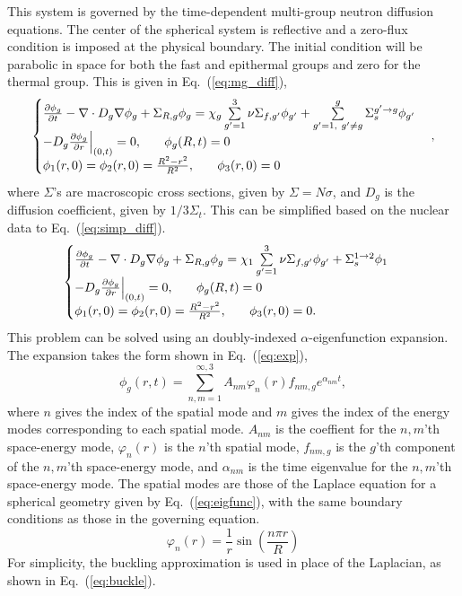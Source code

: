 \documentclass{style/nseJournal}
\newcommand{\fn}[1]{\left( #1 \right)}
\newcommand{\dxdy}[2]{\frac{\partial #1}{\partial #2}}
\newcommand{\be}{\begin{equation}}
\newcommand{\ee}{\end{equation}}
\newcommand{\pev}{\hspace{0.25in}}
\newcommand{\LEQ}[1]{\label{eq:#1}}
\newcommand{\EQ}[1]{Eq.~(\ref{eq:#1})}
\begin{document}
This system is governed by the time-dependent multi-group neutron diffusion equations.  
The center of the spherical system is reflective and a zero-flux condition is imposed at the physical boundary.  
The initial condition will be parabolic in space for both the fast and epithermal groups and zero for the thermal group.  
This is given in \EQ{mg_diff},
\be
	\begin{cases}
		\dxdy{\phi_g}{t} - \nabla \cdot D_g \nabla \phi_g + \Sigma_{R,g} \phi_g = \chi_g \sum\limits_{g'=1}^{3} 
			\nu\Sigma_{f,g'} \phi_{g'} + \sum\limits_{g'=1, \ g' \neq g}^g \Sigma_s^{g' \rightarrow g} \phi_{g'} \\
		-D_g \dxdy{\phi_g}{r} \Big\rvert_{(0,t)} = 0, \pev \phi_g(R,t) = 0 \\
		\phi_1(r,0) = \phi_2(r,0) = \frac{R^2 - r^2}{R^2}, \pev \phi_3(r,0) = 0
	\end{cases} ,
	\LEQ{mg_diff}
\ee 
where $\Sigma$'s are macroscopic cross sections, given by $\Sigma = N\sigma$, and $D_g$ is the diffusion coefficient, given by $1/3\Sigma_t$.  
This can be simplified based on the nuclear data to \EQ{simp_diff}.
\be
	\begin{cases}
		\dxdy{\phi_g}{t} - \nabla \cdot D_g \nabla \phi_g + \Sigma_{R,g} \phi_g = \chi_1 \sum\limits_{g'=1}^{3} 
			\nu\Sigma_{f,g'} \phi_{g'} + \Sigma_s^{1 \rightarrow 2} \phi_{1} \\
		-D_g \dxdy{\phi_g}{r} \Big\rvert_{(0,t)} = 0, \pev \phi_g(R,t) = 0 \\
		\phi_1(r,0) = \phi_2(r,0) = \frac{R^2 - r^2}{R^2}, \pev \phi_3(r,0) = 0.
	\end{cases} 
	\LEQ{simp_diff}
\ee
This problem can be solved using an doubly-indexed $\alpha$-eigenfunction expansion.  
The expansion takes the form shown in \EQ{exp},
\be
	\phi_g(r, t) = \sum_{n, m = 1}^{\infty, 3} A_{nm} \varphi_n(r) f_{nm, g} e^{\alpha_{nm} t},
	\LEQ{exp} 
\ee
where $n$ gives the index of the spatial mode and $m$ gives the index of the energy modes corresponding to each spatial mode.  
$A_{nm}$ is the coeffient for the $n,m$'th space-energy mode, $\varphi_n(r)$ is 
the $n$'th spatial mode, $f_{nm, g}$ is the $g$'th component of the $n,m$'th space-energy mode, and $\alpha_{nm}$ is the time eigenvalue for the $n,m$'th space-energy mode.  
The spatial modes are those of the Laplace equation for a spherical geometry given by \EQ{eigfunc}, with the same boundary conditions as those in the governing equation.  
\be
	\varphi_n(r) = \frac{1}{r} \sin\fn{ \frac{n \pi r}{R} }
	\LEQ{eigfunc}
\ee
For simplicity, the buckling approximation is used in place of the Laplacian, as shown in \EQ{buckle}.  
\end{document}
